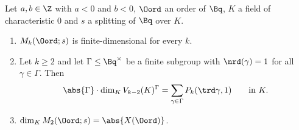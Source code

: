 Let $a,b\in\Z$ with $a<0$ and $b<0$, $\Oord$ an order of $\Bq$, $K$ a field of characteristic $0$ and $s$ a splitting of $\Bq$ over $K$.
\begin{enumerate}[label=(\alph*)]
\item $M_k(\Oord;s)$ is finite-dimensional for every $k$.
\item Let $k\ge2$ and let $\Gamma\le\Bq^\times$ be a finite subgroup with $\nrd(\gamma)=1$ for all $\gamma\in\Gamma$. Then
  \[\abs{\Gamma}\cdot\dim_KV_{k-2}(K)^{\Gamma}=\sum_{\gamma\in\Gamma}P_k(\trd\gamma,1)\qquad\text{in }K.\]
\item $\dim_KM_2(\Oord;s)=\abs{X(\Oord)}$.
\end{enumerate}
